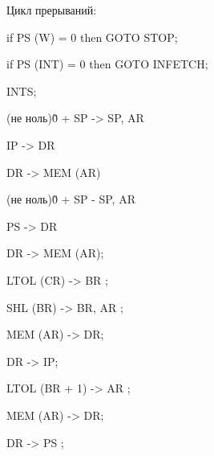 \documentclass{article}
\begin{document}
\begin{minipage}{.5\textwidth}
    Цикл прерываний: 

    if PS (W) = 0 then GOTO STOP;
    
    if PS (INT) = 0 then GOTO INFETCH;
    
    INTS;
    
    (не ноль)\~0 + SP -> SP, AR
    
    IP -> DR
    
    DR -> MEM (AR)
    
    (не ноль)\~0 + SP - SP, AR
    
    PS -> DR
    
    DR -> MEM (AR);
    
    LTOL (CR) -> BR ;
    
    SHL (BR) -> BR, AR ;
    
    MEM (AR) -> DR;
    
    DR -> IP;
    
    LTOL (BR + 1) -> AR ;
    
    MEM (AR) -> DR;
    
    DR -> PS ;
\end{minipage}
\hfill
\end{document}
